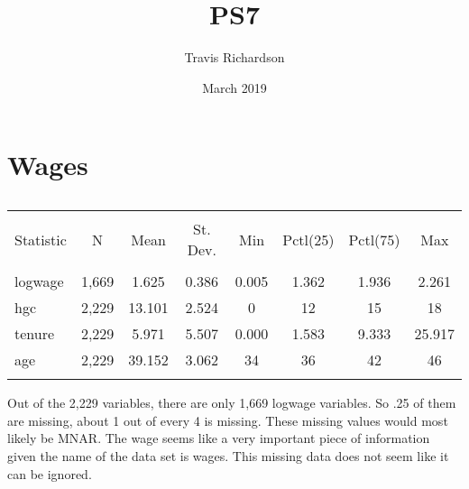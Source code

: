 \documentclass{article}
\title{PS7}
\author{Travis Richardson }
\date{March 2019}
\begin{document}
\maketitle

\section{Wages}
\begin{table}[!htbp] \centering 
  \caption{} 
  \label{} 
\begin{tabular}{@{\extracolsep{5pt}}lccccccc} 
\\[-1.8ex]\hline 
\hline \\[-1.8ex] 
Statistic & \multicolumn{1}{c}{N} & \multicolumn{1}{c}{Mean} & \multicolumn{1}{c}{St. Dev.} & \multicolumn{1}{c}{Min} & \multicolumn{1}{c}{Pctl(25)} & \multicolumn{1}{c}{Pctl(75)} & \multicolumn{1}{c}{Max} \\ 
\hline \\[-1.8ex] 
logwage & 1,669 & 1.625 & 0.386 & 0.005 & 1.362 & 1.936 & 2.261 \\ 
hgc & 2,229 & 13.101 & 2.524 & 0 & 12 & 15 & 18 \\ 
tenure & 2,229 & 5.971 & 5.507 & 0.000 & 1.583 & 9.333 & 25.917 \\ 
age & 2,229 & 39.152 & 3.062 & 34 & 36 & 42 & 46 \\ 
\hline \\[-1.8ex] 
\end{tabular} 
\end{table} 

Out of the 2,229 variables, there are only 1,669 logwage variables. So .25 of them are missing, about 1 out of every 4 is missing. These missing values would most likely be MNAR. The wage seems like a very important piece of information given the name of the data set is wages. This missing data does not seem like it can be ignored.
\end{document}
